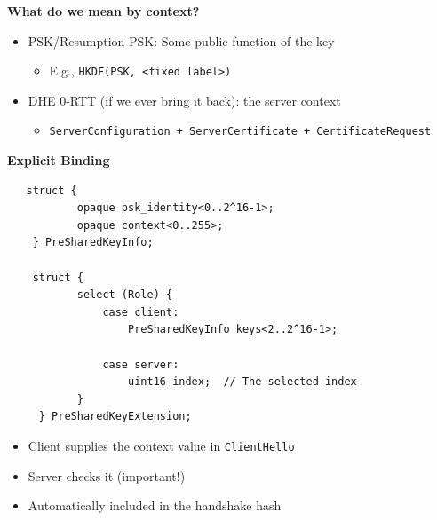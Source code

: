 \documentclass[helvetica]{seminar}
\newcommand{\heading}[1]{%
  \begin{center} 
    \large\bf 
    #1 
  \end{center} 
  \vspace{.4 in}}
\begin{document}
\begin{slide}
\heading{What do we mean by context?}

\begin{itemize}
\item PSK/Resumption-PSK: Some public function of the key
  \begin{itemize}
  \item E.g., \verb^HKDF(PSK, <fixed label>)^
  \end{itemize}

\item DHE 0-RTT (if we ever bring it back): the server context
  \begin{itemize}
  \item \verb^ServerConfiguration + ServerCertificate + CertificateRequest^
  \end{itemize}
\end{itemize}
\end{slide}


\begin{slide}
\heading{Explicit Binding}


{\scriptsize
\begin{verbatim}
   struct {
           opaque psk_identity<0..2^16-1>;
           opaque context<0..255>;
    } PreSharedKeyInfo;

    struct {
           select (Role) {
               case client:
                   PreSharedKeyInfo keys<2..2^16-1>;

               case server:
                   uint16 index;  // The selected index
           }
     } PreSharedKeyExtension;
\end{verbatim}
}

\begin{itemize}
\item Client supplies the context value in \verb^ClientHello^
\item Server checks it (important!)
\item Automatically included in the handshake hash
\end{itemize}
\end{slide}
\end{document}
